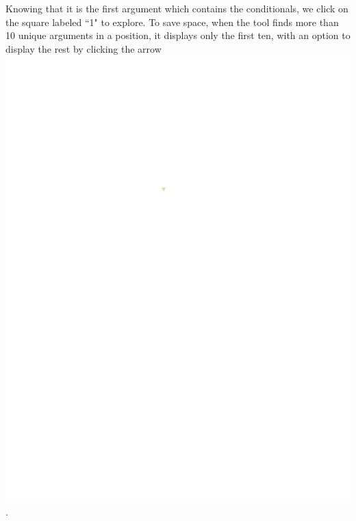 \documentclass[conference]{IEEEtran}
\begin{document}
	Knowing that it is the first argument which contains the conditionals, we click
	on the square labeled ``1" to explore. To save space, when the tool finds more
	than 10 unique arguments in a position, it displays only the first ten, with an
	option to display the rest by clicking the arrow
	\includegraphics{glossary-arrow}.
	
\end{document}
